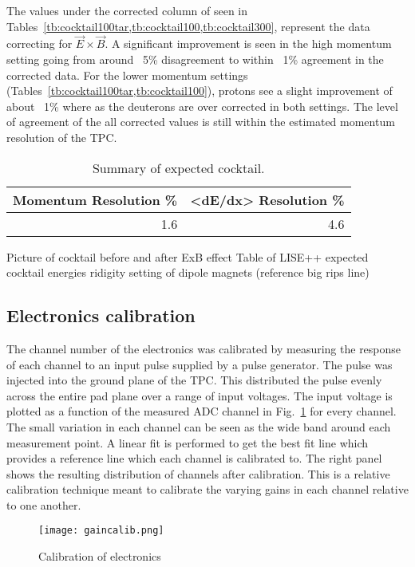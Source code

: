The values under the corrected column of seen in Tables~\cref{tb:cocktail100tar,tb:cocktail100,tb:cocktail300}, represent the data correcting for $\vec{E}\times\vec{B}$. A significant improvement is seen in the high momentum setting going from around ~5\% disagreement to within ~1\% agreement in the corrected data. For the lower momentum settings (Tables~\cref{tb:cocktail100tar,tb:cocktail100}), protons see a slight improvement of about ~1\% where as the deuterons are over corrected in both settings. The level of agreement of the all corrected values is still within the estimated momentum resolution of the TPC. 

\begin{table*}\centering
{}
\begin{tabular}{@{}rr@{}}\toprule
Momentum Resolution \% & <dE/dx> Resolution \% \\
\midrule
1.6  & 4.6\\
\bottomrule
\end{tabular}
\caption{Summary of expected cocktail. }
\label{tb:momresolution}
\end{table*}

Picture of cocktail before and after ExB effect
Table of LISE++ expected cocktail energies ridigity setting of dipole magnets (reference big rips line)



\subsection{Electronics calibration}
The channel number of the electronics was calibrated by measuring the response of each channel to an input pulse supplied by a pulse generator. The pulse was injected into the ground plane of the TPC. This distributed the pulse evenly across the entire pad plane over a range of input voltages. The input voltage is plotted as a function of the measured ADC channel in Fig.~\ref{fig:gaincalib} for every channel. The small variation in each channel can be seen as the wide band around each measurement point. A linear fit is performed to get the best fit line which provides a reference line which each channel is calibrated to. The right panel shows the resulting distribution of channels after calibration. This is a relative calibration technique meant to calibrate the varying gains in each channel relative to one another. 

\begin{figure}[H]
\texttt{[image: gaincalib.png]}
\caption{Calibration of electronics}
\label{fig:gaincalib}
\end{figure}

